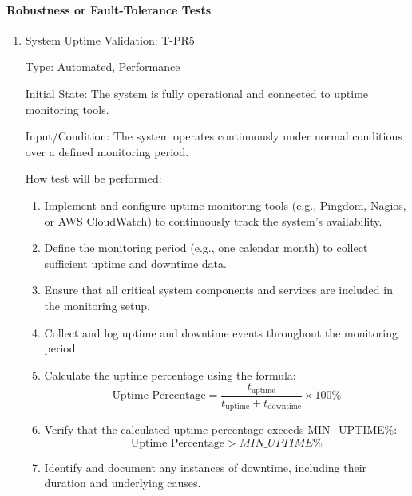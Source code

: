 \documentclass[12pt, titlepage]{article}
\begin{document}
\paragraph{Robustness or Fault-Tolerance Tests}
\begin{enumerate}

\item{System Uptime Validation: T-PR5\\}

Type: Automated, Performance

Initial State: The system is fully operational and connected to uptime monitoring tools.

Input/Condition: The system operates continuously under normal conditions over a defined monitoring period.

How test will be performed:
\begin{enumerate}
    \item Implement and configure uptime monitoring tools (e.g., Pingdom, Nagios, or AWS CloudWatch) to continuously track the system's availability.
    \item Define the monitoring period (e.g., one calendar month) to collect sufficient uptime and downtime data.
    \item Ensure that all critical system components and services are included in the monitoring setup.
    \item Collect and log uptime and downtime events throughout the monitoring period.
    \item Calculate the uptime percentage using the formula:
    \[
    \text{Uptime Percentage} = \frac{t_{\text{uptime}}}{t_{\text{uptime}} + t_{\text{downtime}}} \times 100\%
    \]
    \item Verify that the calculated uptime percentage exceeds \hyperref[MIN_UPTIME]{MIN\_UPTIME}\%:
    \[
    \text{Uptime Percentage} > \hyperref[MIN_UPTIME]{MIN\_UPTIME}\%
    \]
    \item Identify and document any instances of downtime, including their duration and underlying causes.
\end{enumerate}

\end{enumerate}

\end{document}
